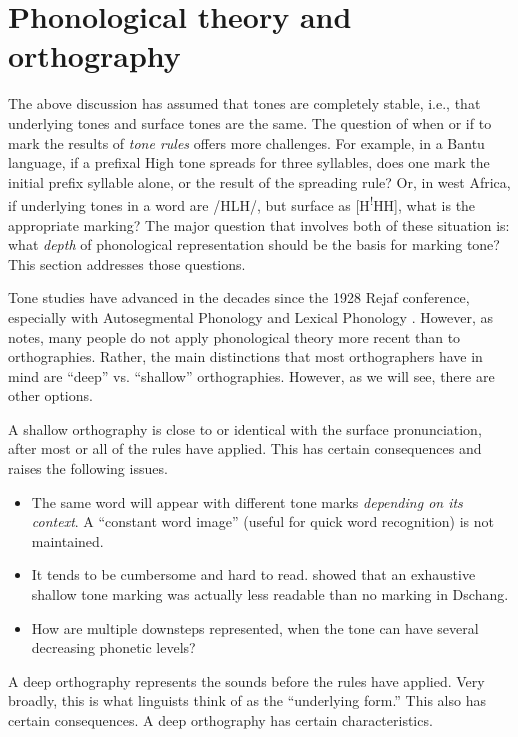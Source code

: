 \documentclass[output=paper]{langscibook}
\begin{document}
\section{Phonological theory and orthography}
\label{sec:PhonTheoryOrtho:4}

The above discussion has assumed that tones are completely stable, i.e., that underlying tones and surface tones are the same. The question of when or if to mark the results of \textit{tone rules} offers more challenges. For example, in a Bantu language, if a prefixal High tone spreads for three syllables, does one mark the initial prefix syllable alone, or the result of the spreading rule? Or, in west Africa, if underlying tones in a word are /HLH/, but surface as [H\textsuperscript{!}HH], what is the appropriate marking? The major question that involves both of these situation is: what \textit{depth} of phonological representation should be the basis for marking tone? This section addresses those questions.

Tone studies have advanced in the decades since the 1928 Rejaf conference, especially with Autosegmental Phonology \citep{Goldsmith1976} and Lexical Phonology \citep{Pulleyblank1986}. However, as \citet{Snider2014} notes, many people do not apply phonological theory more recent than \citet{Halle1968} to orthographies. Rather, the main distinctions that most orthographers have in mind are “deep” vs. “shallow” orthographies. However, as we will see, there are other options.

A shallow orthography is close to or identical with the surface pronunciation, after most or all of the rules have applied. This has certain consequences and raises the following issues.

\begin{itemize}
    \item The same word will appear with different tone marks \textit{depending on its context}. A “constant word image” (useful for quick word recognition) is not maintained.
    \item It tends to be cumbersome and hard to read. \citet{Bird1999a} showed that an exhaustive shallow tone marking was actually less readable than no marking in Dschang.
    \item How are multiple downsteps represented, when the tone can have several decreasing phonetic levels?
\end{itemize}


A deep orthography represents the sounds before the rules have applied. Very broadly, this is what linguists think of as the “underlying form.” This also has certain consequences. A deep orthography has certain characteristics.
\end{document}
